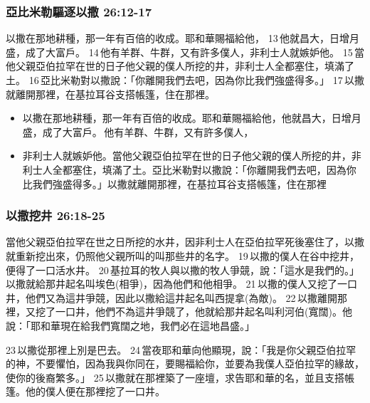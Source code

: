 \subsubsection{亞比米勒驅逐以撒 26:12-17}
以撒在那地耕種，那一年有百倍的收成。耶和華賜福給他， 13 他就昌大，日增月盛，成了大富戶。 14 他有羊群、牛群，又有許多僕人，非利士人就嫉妒他。 15 當他父親亞伯拉罕在世的日子他父親的僕人所挖的井，非利士人全都塞住，填滿了土。 16 亞比米勒對以撒說：「你離開我們去吧，因為你比我們強盛得多。」 17 以撒就離開那裡，在基拉耳谷支搭帳篷，住在那裡。

\begin{itemize} 
\itemsep-.35em 
\item 以撒在那地耕種，那一年有百倍的收成。耶和華賜福給他，他就昌大，日增月盛，成了大富戶。 他有羊群、牛群，又有許多僕人，
\item 非利士人就嫉妒他。當他父親亞伯拉罕在世的日子他父親的僕人所挖的井，非利士人全都塞住，填滿了土。亞比米勒對以撒說：「你離開我們去吧，因為你比我們強盛得多。」以撒就離開那裡，在基拉耳谷支搭帳篷，住在那裡
\end{itemize} 

\subsubsection{以撒挖井 26:18-25 }
當他父親亞伯拉罕在世之日所挖的水井，因非利士人在亞伯拉罕死後塞住了，以撒就重新挖出來，仍照他父親所叫的叫那些井的名字。 19 以撒的僕人在谷中挖井，便得了一口活水井。 20 基拉耳的牧人與以撒的牧人爭競，說：「這水是我們的。」以撒就給那井起名叫埃色(相爭)，因為他們和他相爭。 21 以撒的僕人又挖了一口井，他們又為這井爭競，因此以撒給這井起名叫西提拿(為敵)。 22 以撒離開那裡，又挖了一口井，他們不為這井爭競了，他就給那井起名叫利河伯(寬闊)。他說：「耶和華現在給我們寬闊之地，我們必在這地昌盛。」

23 以撒從那裡上別是巴去。 24 當夜耶和華向他顯現，說：「我是你父親亞伯拉罕的神，不要懼怕，因為我與你同在，要賜福給你，並要為我僕人亞伯拉罕的緣故，使你的後裔繁多。」 25 以撒就在那裡築了一座壇，求告耶和華的名，並且支搭帳篷。他的僕人便在那裡挖了一口井。



